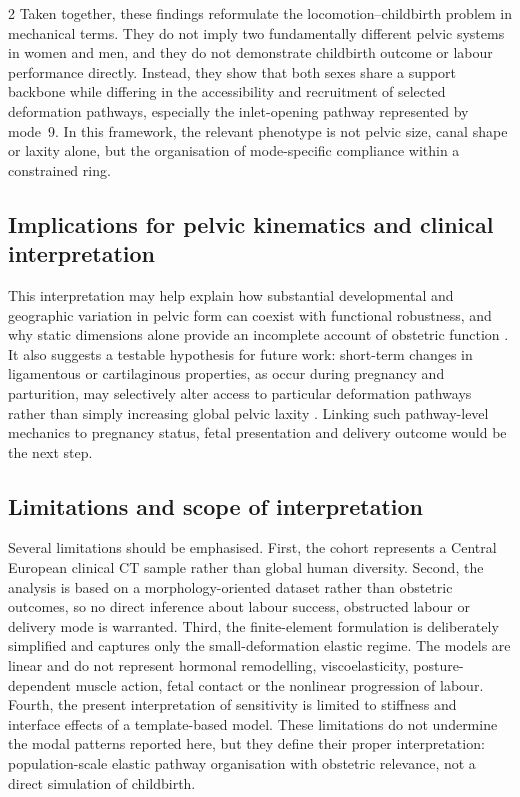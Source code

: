\documentclass[openacc]{rsproca_new}
\begin{document}
\begin{multicols}{2}
Taken together, these findings reformulate the locomotion--childbirth problem in mechanical terms. They do not imply two fundamentally different pelvic systems in women and men, and they do not demonstrate childbirth outcome or labour performance directly. Instead, they show that both sexes share a support backbone while differing in the accessibility and recruitment of selected deformation pathways, especially the inlet-opening pathway represented by mode~9. In this framework, the relevant phenotype is not pelvic size, canal shape or laxity alone, but the organisation of mode-specific compliance within a constrained ring.

\subsection{Implications for pelvic kinematics and clinical interpretation}

This interpretation may help explain how substantial developmental and geographic variation in pelvic form can coexist with functional robustness, and why static dimensions alone provide an incomplete account of obstetric function \cite{BettiManica2018,Auerbach2018,VerbruggenNowlan2017,Novak2020,KurkiDecrausaz2015}. It also suggests a testable hypothesis for future work: short-term changes in ligamentous or cartilaginous properties, as occur during pregnancy and parturition, may selectively alter access to particular deformation pathways rather than simply increasing global pelvic laxity \cite{Vleeming2012,Kiapour2019,Stolarczyk2021}. Linking such pathway-level mechanics to pregnancy status, fetal presentation and delivery outcome would be the next step.

\subsection{Limitations and scope of interpretation}

Several limitations should be emphasised. First, the cohort represents a Central European clinical CT sample rather than global human diversity. Second, the analysis is based on a morphology-oriented dataset rather than obstetric outcomes, so no direct inference about labour success, obstructed labour or delivery mode is warranted. Third, the finite-element formulation is deliberately simplified and captures only the small-deformation elastic regime. The models are linear and do not represent hormonal remodelling, viscoelasticity, posture-dependent muscle action, fetal contact or the nonlinear progression of labour. Fourth, the present interpretation of sensitivity is limited to stiffness and interface effects of a template-based model. These limitations do not undermine the modal patterns reported here, but they define their proper interpretation: population-scale elastic pathway organisation with obstetric relevance, not a direct simulation of childbirth.


\end{multicols}
\end{document}
